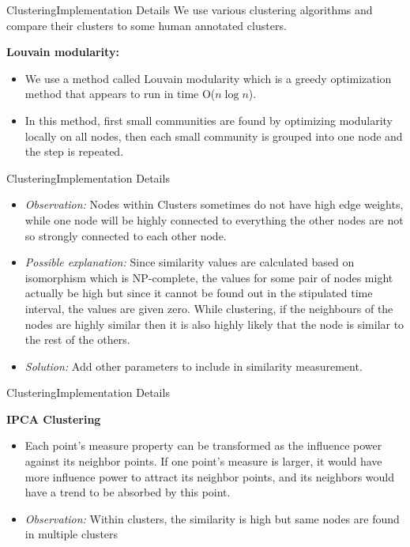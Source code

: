 \documentclass{beamer}
\begin{document}
\begin{frame}{Clustering}{Implementation Details}
We use various clustering algorithms and compare their clusters to some human annotated clusters.

    \textbf{Louvain modularity:}\\
    \begin{itemize}
        \item We use a method called Louvain modularity \cite{louvian} which is a greedy optimization method that appears to run in time O($n\log n$).
        \item In this method, first small communities are found by optimizing modularity locally on all nodes, then each small community is grouped into one node and the step is repeated.
    \end{itemize}
         
\end{frame}

\begin{frame}{Clustering}{Implementation Details}
    \begin{itemize}
        \item \textit{Observation:} Nodes within Clusters sometimes do not have high edge weights, while one node will be highly connected to everything the other nodes are not so strongly connected to each other node. \\ 
        \item \textit{Possible explanation:} Since similarity values are calculated based on isomorphism which is NP-complete, the values for some pair of nodes might actually be high but since it cannot be found out in the stipulated time interval, the values are given zero. While clustering, if the neighbours of the nodes are highly similar then it is also highly likely that the node is similar to the rest of the others.
        \item \textit{Solution:} Add other parameters to include in similarity measurement.
    \end{itemize}
\end{frame}

\begin{frame}{Clustering}{Implementation Details}

    \textbf{IPCA Clustering}\\
    \begin{itemize}
        \item Each point’s measure property can be transformed as the influence power against its neighbor points. If one point’s measure is larger, it would have more
influence power to attract its neighbor points, and its neighbors would have a trend to be absorbed by this point.
        \item  \textit{Observation:} Within clusters, the similarity is high but same nodes are found in multiple clusters
    \end{itemize}
\end{frame}
\end{document}
